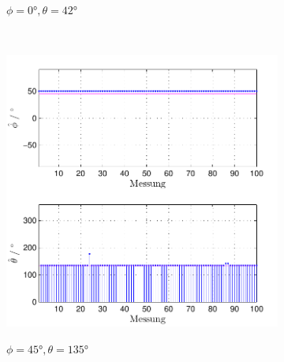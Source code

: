 \begin{figure}
\begin{subfigure}[b]{0.48\textwidth}
                \label{fig:Foto_DSP_Draufsicht}
                \caption{$\phi=0°, \theta = 42°$}
        \end{subfigure}
        ~ %
        \begin{subfigure}[b]{0.48\textwidth}
                \centering
                \includegraphics[width=\textwidth]{grafiken/04_Echtzeitversuch/MALE_Phi_45_Theta_135}
                \label{fig:Foto_DSP_Draufsicht}
                \caption{$\phi=45°, \theta = 135°$}
        \end{subfigure}
        ~ %
        \begin{subfigure}[b]{0.48\textwidth}
                \centering

\end{subfigure}
\end{figure}
